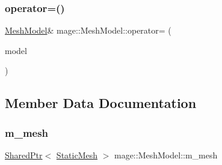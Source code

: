 \hypertarget{classmage_1_1_mesh_model_ab01cee26691745ec7cd1af933bb5fa99}{}\label{classmage_1_1_mesh_model_ab01cee26691745ec7cd1af933bb5fa99} 
\subsubsection{\texorpdfstring{operator=()}{operator=()}\hspace{0.1cm}{\footnotesize\ttfamily [2/2]}}
{\footnotesize\ttfamily \hyperlink{classmage_1_1_mesh_model}{Mesh\+Model}\& mage\+::\+Mesh\+Model\+::operator= (\begin{DoxyParamCaption}\item[{\hyperlink{classmage_1_1_mesh_model}{Mesh\+Model} \&\&}]{model }\end{DoxyParamCaption})\hspace{0.3cm}{\ttfamily [delete]}}



\subsection{Member Data Documentation}
\hypertarget{classmage_1_1_mesh_model_a938e3a83fa927b2427212bd2e397aa87}{}\label{classmage_1_1_mesh_model_a938e3a83fa927b2427212bd2e397aa87} 
\subsubsection{\texorpdfstring{m\+\_\+mesh}{m\_mesh}}
{\footnotesize\ttfamily \hyperlink{namespacemage_a1e01ae66713838a7a67d30e44c67703e}{Shared\+Ptr}$<$ \hyperlink{classmage_1_1_static_mesh}{Static\+Mesh} $>$ mage\+::\+Mesh\+Model\+::m\+\_\+mesh\hspace{0.3cm}{\ttfamily [private]}}

